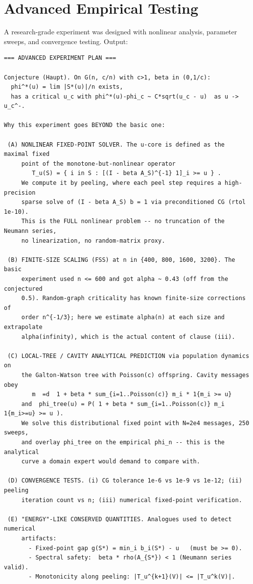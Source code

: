 \documentclass[11pt]{article}
\begin{document}
\section{Advanced Empirical Testing}

A research-grade experiment was designed with nonlinear analysis, parameter sweeps,
and convergence testing. Output:

\begin{lstlisting}
=== ADVANCED EXPERIMENT PLAN ===

Conjecture (Haupt). On G(n, c/n) with c>1, beta in (0,1/c):
  phi^*(u) = lim |S*(u)|/n exists,
  has a critical u_c with phi^*(u)-phi_c ~ C*sqrt(u_c - u)  as u -> u_c^-.

Why this experiment goes BEYOND the basic one:

 (A) NONLINEAR FIXED-POINT SOLVER. The u-core is defined as the maximal fixed
     point of the monotone-but-nonlinear operator
        T_u(S) = { i in S : [(I - beta A_S)^{-1} 1]_i >= u } .
     We compute it by peeling, where each peel step requires a high-precision
     sparse solve of (I - beta A_S) b = 1 via preconditioned CG (rtol 1e-10).
     This is the FULL nonlinear problem -- no truncation of the Neumann series,
     no linearization, no random-matrix proxy.

 (B) FINITE-SIZE SCALING (FSS) at n in {400, 800, 1600, 3200}. The basic
     experiment used n <= 600 and got alpha ~ 0.43 (off from the conjectured
     0.5). Random-graph criticality has known finite-size corrections of
     order n^{-1/3}; here we estimate alpha(n) at each size and extrapolate
     alpha(infinity), which is the actual content of clause (iii).

 (C) LOCAL-TREE / CAVITY ANALYTICAL PREDICTION via population dynamics on
     the Galton-Watson tree with Poisson(c) offspring. Cavity messages obey
        m  =d  1 + beta * sum_{i=1..Poisson(c)} m_i * 1{m_i >= u}
     and  phi_tree(u) = P( 1 + beta * sum_{i=1..Poisson(c)} m_i 1{m_i>=u} >= u ).
     We solve this distributional fixed point with N=2e4 messages, 250 sweeps,
     and overlay phi_tree on the empirical phi_n -- this is the analytical
     curve a domain expert would demand to compare with.

 (D) CONVERGENCE TESTS. (i) CG tolerance 1e-6 vs 1e-9 vs 1e-12; (ii) peeling
     iteration count vs n; (iii) numerical fixed-point verification.

 (E) "ENERGY"-LIKE CONSERVED QUANTITIES. Analogues used to detect numerical
     artifacts:
       - Fixed-point gap g(S*) = min_i b_i(S*) - u   (must be >= 0).
       - Spectral safety:  beta * rho(A_{S*}) < 1 (Neumann series valid).
       - Monotonicity along peeling: |T_u^{k+1}(V)| <= |T_u^k(V)|.


\end{lstlisting}
\end{document}
